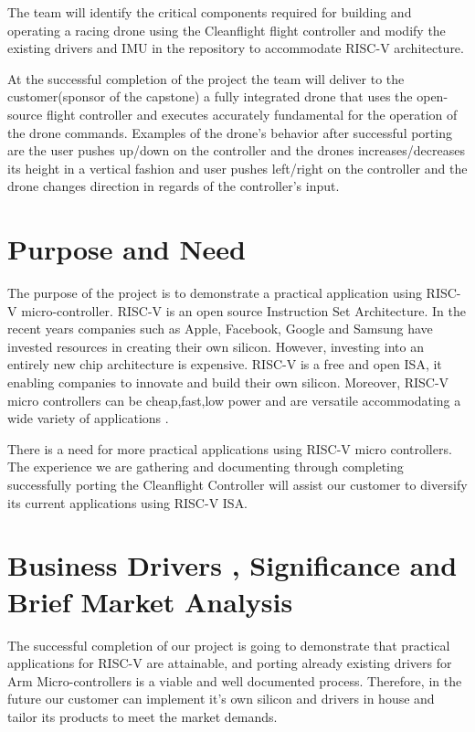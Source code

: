 The team will identify the critical components required for building and operating a racing drone using the Cleanflight flight controller and modify the existing drivers and IMU in the repository to accommodate RISC-V architecture.

At the successful completion of the project the team will deliver to the customer(sponsor of the capstone) a fully integrated drone that uses the open-source flight controller and executes accurately fundamental for the operation of the drone commands. Examples of the drone’s behavior after successful porting are the user pushes up/down on the controller and the drones increases/decreases its height in a vertical fashion and user pushes left/right on the controller and the drone changes  direction in regards of the controller’s input.

\section{Purpose and Need}

The purpose of the project is to demonstrate a practical application using RISC-V micro-controller. RISC-V is an open source Instruction Set Architecture. In the recent years companies such as Apple, Facebook, Google and Samsung have invested resources in creating their own silicon. However, investing into an entirely new chip architecture is expensive. RISC-V is a free and open ISA, it enabling companies to innovate and build their own silicon. Moreover, RISC-V micro controllers can be cheap,fast,low power and are versatile accommodating a wide variety of applications . 

There is a need for more practical applications using RISC-V micro controllers. The experience we are gathering and documenting through completing successfully porting the Cleanflight Controller will assist our customer to diversify its current applications using RISC-V ISA.

\pagebreak

\section{Business Drivers , Significance and Brief Market Analysis}

The successful completion of our project is going to demonstrate that practical applications for RISC-V are attainable, and porting already existing drivers for Arm Micro-controllers is a viable and well documented process. Therefore, in the future our customer can implement it’s own silicon and drivers in house and tailor its products to meet the market demands. 

